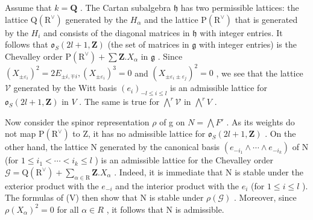 Assume that \(k = \mathbf{Q}\) . The Cartan subalgebra \(\mathfrak{h}\) has two permissible lattices: the lattice \(\mathrm{Q}(\mathrm{R}^{\vee})\) generated by the \(H_{\alpha}\) and the lattice \(\mathrm{P}(\mathrm{R}^{\vee})\) that is generated by the \(H_{i}\) and consists of the diagonal matrices in \(\mathfrak{h}\) with integer entries. It follows that \(\mathfrak{o}_S(2l + 1, \mathbf{Z})\) (the set of matrices in \(\mathfrak{g}\) with integer entries) is the Chevalley order \(\mathrm{P}(\mathrm{R}^{\vee}) + \sum \mathbf{Z}.X_{\alpha}\) in \(\mathfrak{g}\) . Since \((X_{\pm \varepsilon_i})^2 = 2E_{\pm i,\mp i}, (X_{\pm \varepsilon_i})^3 = 0\) and \((X_{\pm \varepsilon_i\pm \varepsilon_j})^2 = 0\) , we see that the lattice \(\mathcal{V}\) generated by the Witt basis \((e_i)_{-l\leq i\leq l}\) is an admissible lattice for \(\mathfrak{o}_S(2l + 1,\mathbf{Z})\) in \(V\) . The same is true for \(\bigwedge^r\mathcal{V}\) in \(\bigwedge^r V\) .

Now consider the spinor representation \(\rho\) of g on \(N = \bigwedge F'\) . As its weights do not map \(\mathrm{P}(\mathrm{R}^{\vee})\) to Z, it has no admissible lattice for \(\mathfrak{o}_{S}(2l + 1, \mathbf{Z})\) . On the other hand, the lattice N generated by the canonical basis \((e_{-i_{1}} \wedge \cdots \wedge e_{-i_{k}})\) of N (for \(1 \leq i_{1} < \cdots < i_{k} \leq l\) ) is an admissible lattice for the Chevalley order \(\mathcal{G} = \mathrm{Q}(\mathrm{R}^{\vee}) + \sum_{\alpha \in \mathrm{R}} \mathbf{Z}. X_{\alpha}\) . Indeed, it is immediate that N is stable under the exterior product with the \(e_{-i}\) and the interior product with the \(e_{i}\) (for \(1 \leq i \leq l\) ). The formulas of (V) then show that N is stable under \(\rho(\mathcal{G})\) . Moreover, since \(\rho(X_{\alpha})^{2} = 0\) for all \(\alpha \in R\) , it follows that N is admissible.

